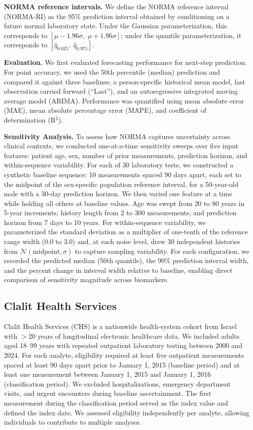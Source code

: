 \documentclass[11pt]{article}
\begin{document}
\textbf{NORMA reference intervals.} We define the NORMA reference interval (NORMA-RI) as the 95\% prediction interval obtained by conditioning on a future normal laboratory state. Under the Gaussian parameterization, this corresponds to $[\mu - 1.96\sigma,\; \mu + 1.96\sigma]$; under the quantile parameterization, it corresponds to $[\hat{q}_{0.025},\; \hat{q}_{0.975}]$.

\textbf{Evaluation.} We first evaluated forecasting performance for next-step prediction. For point accuracy, we used the 50th percentile (median) prediction and compared it against three baselines: a person-specific historical mean model, last observation carried forward (``Last''), and an autoregressive integrated moving average model (ARIMA). Performance was quantified using mean absolute error (MAE), mean absolute percentage error (MAPE), and coefficient of determination (R$^2$).

\textbf{Sensitivity Analysis.} To assess how NORMA captures uncertainty across clinical contexts, we conducted one-at-a-time sensitivity sweeps over five input features: patient age, sex, number of prior measurements, prediction horizon, and within-sequence variability. For each of 30 laboratory tests, we constructed a synthetic baseline sequence: 10 measurements spaced 90 days apart, each set to the midpoint of the sex-specific population reference interval, for a 50-year-old male with a 30-day prediction horizon. We then varied one feature at a time while holding all others at baseline values. Age was swept from 20 to 80 years in 5-year increments; history length from 2 to 300 measurements; and prediction horizon from 7 days to 10 years. For within-sequence variability, we parameterized the standard deviation as a multiplier of one-tenth of the reference range width (0.0 to 3.0) and, at each noise level, drew 30 independent histories from $\mathcal{N}(\text{midpoint}, \sigma)$ to capture sampling variability. For each configuration, we recorded the predicted median (50th quantile), the 90\% prediction interval width, and the percent change in interval width relative to baseline, enabling direct comparison of sensitivity magnitude across biomarkers.

\subsection*{Clalit Health Services}

Clalit Health Services (CHS) is a nationwide health-system cohort from Israel with $>$20 years of longitudinal electronic healthcare data. We included adults aged 18--99 years with repeated outpatient laboratory testing between 2000 and 2024. For each analyte, eligibility required at least five outpatient measurements spaced at least 90 days apart prior to January 1, 2015 (baseline period) and at least one measurement between January 1, 2015 and January 1, 2016 (classification period). We excluded hospitalizations, emergency department visits, and urgent encounters during baseline ascertainment. The first measurement during the classification period served as the index value and defined the index date. We assessed eligibility independently per analyte, allowing individuals to contribute to multiple analyses.
\end{document}
